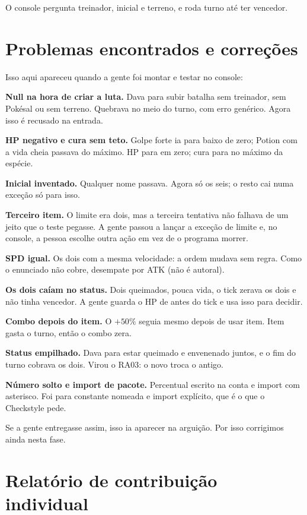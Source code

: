 \documentclass[12pt,oneside,a4paper,article]{abntex2}
\begin{document}
O console pergunta treinador, inicial e terreno, e roda turno até ter
vencedor.

\section{Problemas encontrados e correções}
\label{sec:bugs}

Isso aqui apareceu quando a gente foi montar e testar no console:

\textbf{Null na hora de criar a luta.} Dava para subir batalha sem treinador,
sem Pokésal ou sem terreno. Quebrava no meio do turno, com erro genérico.
Agora isso é recusado na entrada.

\textbf{HP negativo e cura sem teto.} Golpe forte ia para baixo de zero;
Potion com a vida cheia passava do máximo. HP para em zero; cura para no
máximo da espécie.

\textbf{Inicial inventado.} Qualquer nome passava. Agora só os seis; o resto
cai numa exceção só para isso.

\textbf{Terceiro item.} O limite era dois, mas a terceira tentativa não
falhava de um jeito que o teste pegasse. A gente passou a lançar a exceção de limite
e, no console, a pessoa escolhe outra ação em vez de o programa morrer.

\textbf{SPD igual.} Os dois com a mesma velocidade: a ordem mudava sem
regra. Como o enunciado não cobre, desempate por ATK (não é autoral).

\textbf{Os dois caíam no status.} Dois queimados, pouca vida, o tick zerava
os dois e não tinha vencedor. A gente guarda o HP de antes do tick e usa
isso para decidir.

\textbf{Combo depois do item.} O $+50\%$ seguia mesmo depois de usar item.
Item gasta o turno, então o combo zera.

\textbf{Status empilhado.} Dava para estar queimado e envenenado juntos, e o
fim do turno cobrava os dois. Virou o RA03: o novo troca o antigo.

\textbf{Número solto e import de pacote.} Percentual escrito na conta e
import com asterisco. Foi para constante nomeada e import explícito, que é
o que o Checkstyle pede.

Se a gente entregasse assim, isso ia aparecer na arguição. Por isso
corrigimos ainda nesta fase.

\section{Relatório de contribuição individual}
\label{sec:contribuicao}
\end{document}
